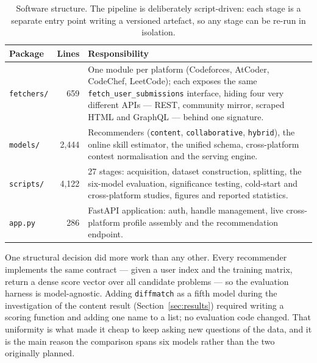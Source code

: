 \documentclass[12pt,a4paper]{article}
\begin{document}
\begin{table}[h]
\centering
\caption{Software structure. The pipeline is deliberately script-driven: each stage is a
separate entry point writing a versioned artefact, so any stage can be re-run in
isolation.}
\label{tab:structure}
\small
\begin{tabularx}{\textwidth}{@{}lrX@{}}
\toprule
\textbf{Package} & \textbf{Lines} & \textbf{Responsibility} \\
\midrule
\texttt{fetchers/} & 659 & One module per platform (Codeforces, AtCoder, CodeChef,
LeetCode); each exposes the same \texttt{fetch\_user\_submissions} interface, hiding four
very different APIs --- REST, community mirror, scraped HTML and GraphQL --- behind one
signature. \\
\texttt{models/} & 2{,}444 & Recommenders (\texttt{content}, \texttt{collaborative},
\texttt{hybrid}), the online skill estimator, the unified schema, cross-platform contest
normalisation and the serving engine. \\
\texttt{scripts/} & 4{,}122 & 27 stages: acquisition, dataset construction,
splitting, the six-model evaluation, significance testing, cold-start and
cross-platform studies, figures and reported statistics. \\
\texttt{app.py} & 286 & FastAPI application: auth, handle management, live
cross-platform profile assembly and the recommendation endpoint. \\
\bottomrule
\end{tabularx}
\end{table}

One structural decision did more work than any other. Every recommender implements the
same contract --- given a user index and the training matrix, return a dense score vector
over all candidate problems --- so the evaluation harness is model-agnostic. Adding
\texttt{diffmatch} as a fifth model during the investigation of the content result
(Section~\ref{sec:results}) required writing a scoring function and adding one name to a
list; no evaluation code changed. That uniformity is what made it cheap to keep asking
new questions of the data, and it is the main reason the comparison spans six models
rather than the two originally planned.
\end{document}
